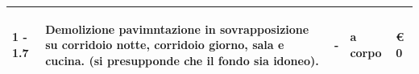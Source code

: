 \documentclass[a4paper]{article}
\begin{document}
\begin{tabular}{ | L{10mm} |  L{86mm} | L{12mm} | L{12mm} | L{16mm} | }
                              \vspace{2.5mm}
                              \begin{spacing}{0}
                           1 - 1.7
                              \end{spacing} &
                              \vspace{2.5mm}
                              \begin{spacing}{0}
                           Demolizione pavimntazione in sovrapposizione su corridoio notte, corridoio giorno, sala e cucina. (si presupponde che il fondo sia idoneo).
                              \end{spacing} &
                              \vspace{2.5mm}
                              \begin{spacing}{0}
                           -
                              \end{spacing} &
                              \vspace{2.5mm}
                              \begin{spacing}{0}
                           a corpo
                              \end{spacing} &
                              \vspace{2.5mm}
                              \begin{spacing}{0}
                                \euro\hfill 
                            0
                              \end{spacing} \\
                              \hline


\end{tabular}
\end{document}
